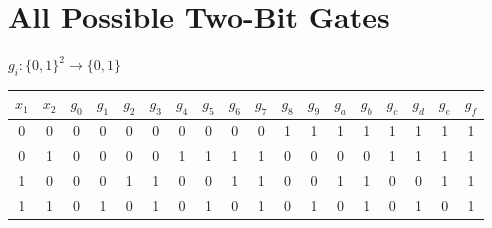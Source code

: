 \documentclass{iansnotes}
\begin{document}
\section{All Possible Two-Bit Gates}

$g_i : \{0,1\}^2 \rightarrow \{0,1\}$
\vspace{4mm}

\begin{tabular}{cc|cccccccccccccccc}
  $x_1$ & $x_2$ & $g_0$ & $g_1$ & $g_2$ & $g_3$ & $g_4$ & $g_5$ & $g_6$ & $g_7$ & $g_8$ & $g_9$ & $g_a$ & $g_b$ & $g_c$ & $g_d$ & $g_e$ & $g_f$ \\
  \midrule
  0 & 0 & 0 & 0 & 0 & 0 & 0 & 0 & 0 & 0 & 1 & 1 & 1 & 1 & 1 & 1 & 1 & 1 \\
  0 & 1 & 0 & 0 & 0 & 0 & 1 & 1 & 1 & 1 & 0 & 0 & 0 & 0 & 1 & 1 & 1 & 1 \\
  1 & 0 & 0 & 0 & 1 & 1 & 0 & 0 & 1 & 1 & 0 & 0 & 1 & 1 & 0 & 0 & 1 & 1 \\
  1 & 1 & 0 & 1 & 0 & 1 & 0 & 1 & 0 & 1 & 0 & 1 & 0 & 1 & 0 & 1 & 0 & 1 \\
\end{tabular}
\end{document}
